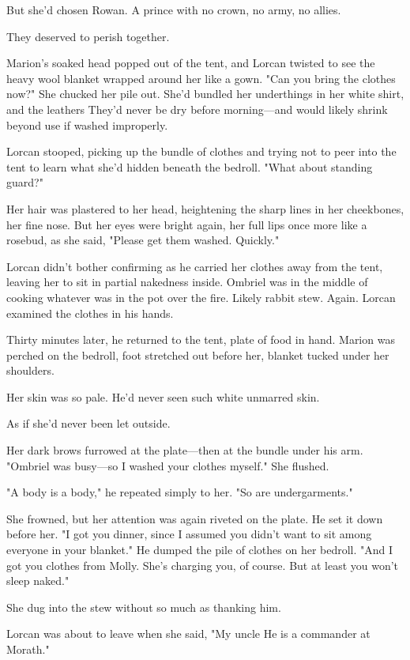 But she'd chosen Rowan. A prince with no crown, no army, no allies.

They deserved to perish together.

Marion's soaked head popped out of the tent, and Lorcan twisted to see the heavy wool blanket wrapped around her like a gown. "Can you bring the clothes now?" She chucked her pile out. She'd bundled her underthings in her white shirt, and the leathers  They'd never be dry before morning---and would likely shrink beyond use if washed improperly.

Lorcan stooped, picking up the bundle of clothes and trying not to peer into the tent to learn what she'd hidden beneath the bedroll. "What about standing guard?"

Her hair was plastered to her head, heightening the sharp lines in her cheekbones, her fine nose. But her eyes were bright again, her full lips once more like a rosebud, as she said, "Please get them washed. Quickly."

Lorcan didn't bother confirming as he carried her clothes away from the tent, leaving her to sit in partial nakedness inside. Ombriel was in the middle of cooking whatever was in the pot over the fire. Likely rabbit stew. Again. Lorcan examined the clothes in his hands.

Thirty minutes later, he returned to the tent, plate of food in hand. Marion was perched on the bedroll, foot stretched out before her, blanket tucked under her shoulders.

Her skin was so pale. He'd never seen such white unmarred skin.

As if she'd never been let outside.

Her dark brows furrowed at the plate---then at the bundle under his arm. "Ombriel was busy---so I washed your clothes myself." She flushed.

"A body is a body," he repeated simply to her. "So are undergarments."

She frowned, but her attention was again riveted on the plate. He set it down before her. "I got you dinner, since I assumed you didn't want to sit among everyone in your blanket." He dumped the pile of clothes on her bedroll. "And I got you clothes from Molly. She's charging you, of course. But at least you won't sleep naked."

She dug into the stew without so much as thanking him.

Lorcan was about to leave when she said, "My uncle  He is a commander at Morath."

